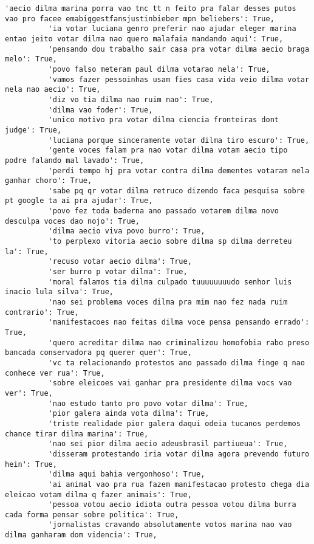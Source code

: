 \documentclass[11pt]{article}
\begin{document}
\begin{Verbatim}[commandchars=\\\{\}]
          'aecio dilma marina porra vao tnc tt n feito pra falar desses putos vao pro facee emabiggestfansjustinbieber mpn beliebers': True,
          'ia votar luciana genro preferir nao ajudar eleger marina entao jeito votar dilma nao quero malafaia mandando aqui': True,
          'pensando dou trabalho sair casa pra votar dilma aecio braga melo': True,
          'povo falso meteram paul dilma votarao nela': True,
          'vamos fazer pessoinhas usam fies casa vida veio dilma votar nela nao aecio': True,
          'diz vo tia dilma nao ruim nao': True,
          'dilma vao foder': True,
          'unico motivo pra votar dilma ciencia fronteiras dont judge': True,
          'luciana porque sinceramente votar dilma tiro escuro': True,
          'gente voces falam pra nao votar dilma votam aecio tipo podre falando mal lavado': True,
          'perdi tempo hj pra votar contra dilma dementes votaram nela ganhar choro': True,
          'sabe pq qr votar dilma retruco dizendo faca pesquisa sobre pt google ta ai pra ajudar': True,
          'povo fez toda baderna ano passado votarem dilma novo desculpa voces dao nojo': True,
          'dilma aecio viva povo burro': True,
          'to perplexo vitoria aecio sobre dilma sp dilma derreteu la': True,
          'recuso votar aecio dilma': True,
          'ser burro p votar dilma': True,
          'moral falamos tia dilma culpado tuuuuuuuudo senhor luis inacio lula silva': True,
          'nao sei problema voces dilma pra mim nao fez nada ruim contrario': True,
          'manifestacoes nao feitas dilma voce pensa pensando errado': True,
          'quero acreditar dilma nao criminalizou homofobia rabo preso bancada conservadora pq querer quer': True,
          'vc ta relacionando protestos ano passado dilma finge q nao conhece ver rua': True,
          'sobre eleicoes vai ganhar pra presidente dilma vocs vao ver': True,
          'nao estudo tanto pro povo votar dilma': True,
          'pior galera ainda vota dilma': True,
          'triste realidade pior galera daqui odeia tucanos perdemos chance tirar dilma marina': True,
          'nao sei pior dilma aecio adeusbrasil partiueua': True,
          'disseram protestando iria votar dilma agora prevendo futuro hein': True,
          'dilma aqui bahia vergonhoso': True,
          'ai animal vao pra rua fazem manifestacao protesto chega dia eleicao votam dilma q fazer animais': True,
          'pessoa votou aecio idiota outra pessoa votou dilma burra cada forma pensar sobre politica': True,
          'jornalistas cravando absolutamente votos marina nao vao dilma ganharam dom videncia': True,

\end{Verbatim}
\end{document}
